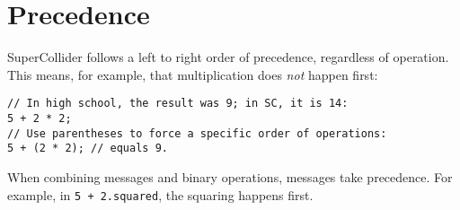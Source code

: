 \section{Precedence}

SuperCollider follows a left to right order of precedence, regardless of operation. This means, for example, that multiplication does \emph{not} happen first:

\begin{lstlisting}[style=SuperCollider-IDE, basicstyle=\scttfamily\footnotesize]
// In high school, the result was 9; in SC, it is 14:
5 + 2 * 2; 
// Use parentheses to force a specific order of operations:
5 + (2 * 2); // equals 9.
\end{lstlisting}

When combining messages and binary operations, messages take precedence. For example, in \texttt{5 + 2.squared}, the squaring happens first.